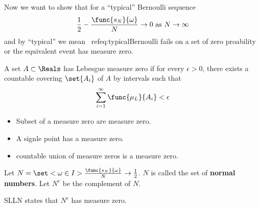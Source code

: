 Now we want to show that for a ``typical'' Bernoulli sequence 
\begin{equation}\label{eq:typicalBernoulli}
    \dfrac{1}{2} - \dfrac{\func{s_N}{\omega}}{N} \to 0 \ \mathrm{as} \ N \to \infty
\end{equation}
and by ``typical'' we mean \ ref{eq:typicalBernoulli} fails on a set of zero proability or the equivalent event has measure zero.
\begin{definition}
    A set \(A \subset \Reals\) has Lebesgue measure zero if for every \(\epsilon > 0\), there exists a countable covering \(\set{A_i}\) of \(A\) by intervals such that 
    \begin{equation*}
        \sum_{i = 1}^{\infty} \func{\mu_L}{A_i} < \epsilon
    \end{equation*}
\end{definition}
\begin{itemize}
    \item Subset of a measure zero are measure zero.
    \item A signle point has a measure zero.
    \item countable union of measure zeros is a measure zero.
\end{itemize}

Let \(N = \set<\omega \in I>{ \frac{\func{s_N}{\omega}}{N} \to \frac{1}{2}}\). \(N\) is called the set of \textbf{normal numbers}. Let \(N^c\) be the complement of \(N\).
\begin{theorem}
    SLLN states that \(N^c\) has measure zero.
\end{theorem}

